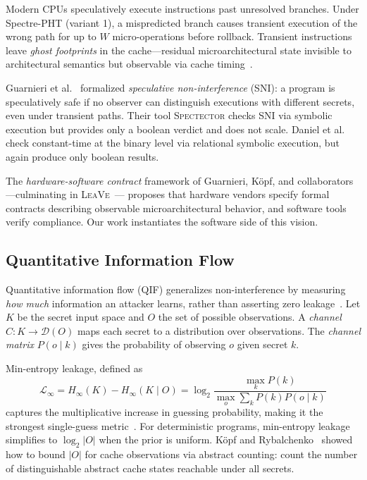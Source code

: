 \documentclass{article}
\theoremstyle{definition}
\theoremstyle{remark}
\begin{document}
Modern CPUs speculatively execute instructions past unresolved branches.
Under Spectre-PHT (variant 1), a mispredicted branch causes transient
execution of the wrong path for up to $W$ micro-operations before rollback.
Transient instructions leave \emph{ghost footprints} in the cache---residual
microarchitectural state invisible to architectural semantics but observable
via cache timing~\cite{ge2018survey}.

Guarnieri et al.~\cite{guarnieri2020spectector} formalized \emph{speculative
non-interference} (SNI): a program is speculatively safe if no observer can
distinguish executions with different secrets, even under transient paths.
Their tool \textsc{Spectector} checks SNI via symbolic execution but provides
only a boolean verdict and does not scale.  Daniel et
al.~\cite{daniel2020binsecrel} check constant-time at the binary level via
relational symbolic execution, but again produce only boolean results.

The \emph{hardware-software contract} framework of Guarnieri, K\"opf, and
collaborators---culminating in \textsc{LeaVe}~\cite{gleissenthall2023leave}---
proposes that hardware vendors specify formal contracts describing observable
microarchitectural behavior, and software tools verify compliance.  Our work
instantiates the software side of this vision.

\subsection{Quantitative Information Flow}
\label{sec:bg-qif}

Quantitative information flow (QIF) generalizes non-interference by measuring
\emph{how much} information an attacker learns, rather than asserting zero
leakage~\cite{smith2009foundations,alvim2020science}.  Let $K$ be the secret
input space and $O$ the set of possible observations.  A \emph{channel}
$C : K \to \mathcal{D}(O)$ maps each secret to a distribution over
observations.  The \emph{channel matrix} $P(o \mid k)$ gives the probability
of observing $o$ given secret $k$.

Min-entropy leakage, defined as
\[
  \mathcal{L}_\infty = H_\infty(K) - H_\infty(K \mid O)
  = \log_2 \frac{\max_k P(k)}{\max_o \sum_k P(k) P(o \mid k)}
\]
captures the multiplicative increase in guessing probability, making it the
strongest single-guess metric~\cite{smith2009foundations}.  For deterministic
programs, min-entropy leakage simplifies to $\log_2 |O|$ when the prior is
uniform.  K\"opf and Rybalchenko~\cite{kopf2010approximation} showed how to
bound $|O|$ for cache observations via abstract counting: count the number
of distinguishable abstract cache states reachable under all secrets.
\end{document}
